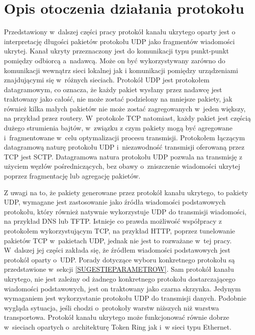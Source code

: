 \documentclass[a4paper, twoside, 12pt]{report}
\begin{document}
    \section{Opis otoczenia działania protokołu}
    Przedstawiony w~dalszej części pracy protokół kanału ukrytego oparty jest o
    interpretację długości pakietów protokołu UDP jako fragmentów wiadomości ukrytej.
    Kanał ukryty przeznaczony jest do komunikacji typu punkt-punkt pomiędzy odbiorcą a~nadawcą.
    Może on być wykorzystywany zarówno do komunikacji wewnątrz sieci lokalnej jak i
    komunikacji pomiędzy urządzeniami znajdującymi się w~różnych sieciach.
    Protokół UDP jest protokołem datagramowym, co
    oznacza, że każdy pakiet wysłany przez nadawcę jest traktowany jako całość, nie może zostać
    podzielony na mniejsze pakiety, jak również kilka małych pakietów nie może zostać
    zagregowanych w~jeden większy, na przykład przez routery. W~protokole TCP natomiast,
    każdy pakiet jest częścią dużego strumienia bajtów, w~związku z czym pakiety mogą
    być agregowane i~fragmentowane w~celu optymalizacji procesu transmisji. Protokołem
    łączącym datagramową naturę protokołu UDP i~niezawodność transmisji oferowaną przez TCP jest
    SCTP\cite{SCTPRFC}. Datagramowa natura protokołu UDP pozwala na transmisję z użyciem
    węzłów pośredniczących, bez obawy o~zniszczenie wiadomości ukrytej poprzez fragmentację
    lub agregację pakietów.

    Z uwagi na to, że pakiety generowane przez protokół kanału ukrytego, to pakiety UDP,
    wymagane jest
    zastosowanie jako źródła wiadomości podstawowych protokołu, który również
    natywnie wykorzystuje UDP do transmisji wiadomości, na przykład DNS lub TFTP.
    Istnieje co prawda możliwość współpracy z protokołem wykorzystującym TCP, na przykład HTTP,
    poprzez tunelowanie pakietów TCP w~pakietach UDP, jednak nie jest to rozważane w~tej
    pracy. W~dalszej jej części zakłada się, że źródłem wiadomości
    podstawowych jest protokół oparty o~UDP. Porady dotyczące wyboru konkretnego
    protokołu są przedstawione w~sekcji \ref{SUGESTIEPARAMETROW}. Sam protokół kanału
    ukrytego, nie jest zależny od żadnego konkretnego protokołu dostarczającego
    wiadomości podstawowych, jest on traktowany jako czarna skrzynka. Jedynym wymaganiem
    jest wykorzystanie protokołu UDP do transmisji danych. Podobnie wygląda sytuacja,
    jeśli chodzi o~protokoły warstw niższych niż warstwa transportowa. Protokół kanału
    ukrytego może funkcjonować równie dobrze w~sieciach opartych o~architekturę
    Token Ring jak i~w sieci typu Ethernet.
\end{document}
